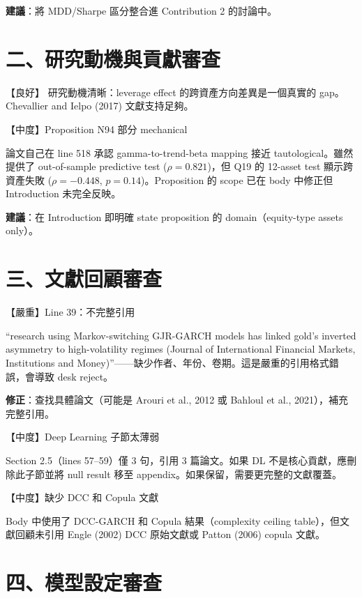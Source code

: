 \documentclass[12pt,a4paper]{article}
\begin{document}
\textbf{建議}：將 MDD/Sharpe 區分整合進 Contribution 2 的討論中。

\section*{二、研究動機與貢獻審查}

\textcolor{okgreen}{【良好】} 研究動機清晰：leverage effect 的跨資產方向差異是一個真實的 gap。Chevallier and Ielpo (2017) 文獻支持足夠。

\textcolor{warncolor}{【中度】Proposition N94 部分 mechanical}

論文自己在 line 518 承認 gamma-to-trend-beta mapping 接近 tautological。雖然提供了 out-of-sample predictive test ($\rho = 0.821$)，但 Q19 的 12-asset test 顯示跨資產失敗 ($\rho = -0.448$, $p = 0.14$)。Proposition 的 scope 已在 body 中修正但 Introduction 未完全反映。

\textbf{建議}：在 Introduction 即明確 state proposition 的 domain（equity-type assets only）。

\section*{三、文獻回顧審查}

\textcolor{errorred}{【嚴重】Line 39：不完整引用}

``research using Markov-switching GJR-GARCH models has linked gold's inverted asymmetry to high-volatility regimes (Journal of International Financial Markets, Institutions and Money)''——缺少作者、年份、卷期。這是嚴重的引用格式錯誤，會導致 desk reject。

\textbf{修正}：查找具體論文（可能是 Arouri et al., 2012 或 Bahloul et al., 2021），補充完整引用。

\bigskip
\textcolor{warncolor}{【中度】Deep Learning 子節太薄弱}

Section 2.5（lines 57--59）僅 3 句，引用 3 篇論文。如果 DL 不是核心貢獻，應刪除此子節並將 null result 移至 appendix。如果保留，需要更完整的文獻覆蓋。

\bigskip
\textcolor{warncolor}{【中度】缺少 DCC 和 Copula 文獻}

Body 中使用了 DCC-GARCH 和 Copula 結果（complexity ceiling table），但文獻回顧未引用 Engle (2002) DCC 原始文獻或 Patton (2006) copula 文獻。

\section*{四、模型設定審查}
\end{document}
